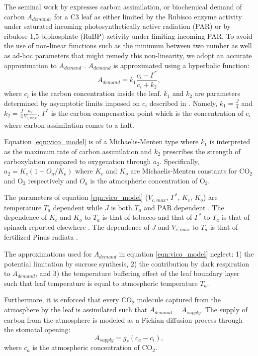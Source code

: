\documentclass[utf8]{frontiersSCNS} %
\begin{document}
The seminal work by \citet{Farquhar1980} expresses carbon assimilation, or biochemical demand of carbon $A_{demand}$, for a C3 leaf as either limited by the Rubisco enzyme activity under saturated incoming photosynthetically active radiation (PAR) or by ribulose-1,5-biphosphate (RuBP) activity under limiting incoming PAR. 
To avoid the use of non-linear functions such as the minimum between two number as well as ad-hoc parameters that might remedy this non-linearity, we adopt an accurate approximation to $A_{demand}$ \citep{Vico2013}. $A_{demand}$ is approximated using a hyperbolic function:
\begin{equation}
    \label{eqn:vico_model}
    A_{demand} = k_1 \frac{c_i - \Gamma^*}{c_i + k_2},
\end{equation}
where $c_i$ is the carbon concentration inside the leaf. $k_1$ and $k_2$ are parameters determined by asymptotic limits imposed on $c_i$ described in \citet{Vico2013}. Namely, $k_1 = \frac{J}{4}$ and $k_2 = \frac{J}{4} \frac{a_2}{V_{c,max}}$. $\Gamma^*$ is the carbon compensation point which is the concentration of $c_i$ where carbon assimilation comes to a halt.

Equation \ref{eqn:vico_model} is of a Michaelis-Menten type where $k_1$ is interpreted as the maximum rate of carbon assimilation and $k_2$ prescribes the strength of carboxylation compared to oxygenation through $a_2$. Specifically, $a_2 = K_c (1+O_a/K_o)$ where $K_c$ and $K_o$ are Michaelis-Menten constants for CO$_2$ and O$_2$ respectively and $O_a$ is the atmospheric concentration of O$_2$.

The parameters of equation \ref{eqn:vico_model} ($V_{c,max}$, $\Gamma^*$, $K_c$, $K_o$) are temperature $T_a$ dependent while $J$ is both $T_a$ and PAR dependent \citep{Medlyn2002}. The dependence of $K_c$ and $K_o$ to $T_a$ is that of tobacco \citep{Bernacchi2001} and that of $\Gamma^*$ to $T_a$ is that of spinach reported elsewhere \citep{Brooks1985}. The dependence of $J$ and $V_{c,max}$ to $T_a$ is that of fertilized Pinus radiata \citep{Medlyn2002}.

The approximations used for $A_{demand}$ in equation \ref{eqn:vico_model} neglect: 1) the potential limitation by sucrose synthesis, 2) the contribution by dark respiration to $A_{demand}$, and 3) the temperature buffering effect of the leaf boundary layer such that leaf temperature is equal to atmospheric temperature $T_a$.

Furthermore, it is enforced that every CO$_2$ molecule captured from the atmosphere by the leaf is assimilated such that $A_{demand} = A_{supply}$. The supply of carbon from the atmosphere is modeled as a Fickian diffusion process through the stomatal opening:
\begin{equation}
    \label{eqn:supply}
    A_{supply} = g_s(c_a - c_i),
\end{equation}
where $c_a$ is the atmospheric concentration of CO$_2$.
\end{document}

